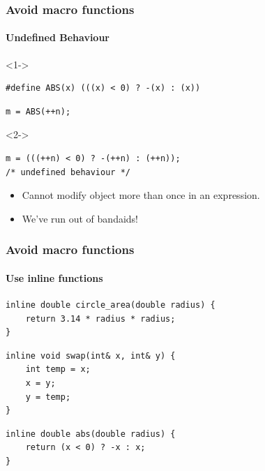 \documentclass[table]{beamer}
\newcounter{rulecount}
\newcommand{\declarerule}{\textbf{\color{themeblue}{Rule \therulecount:}} }
\begin{document}
\begin{frame}[fragile]
    \frametitle{\declarerule Avoid macro functions}
    \framesubtitle{Undefined Behaviour}
    
\begin{uncoverenv}<1->
\begin{lstlisting}[title=A simple abs macro]
#define ABS(x) (((x) < 0) ? -(x) : (x))
\end{lstlisting}

\begin{lstlisting}[title=You write]
m = ABS(++n); 
\end{lstlisting}
\end{uncoverenv}

\begin{uncoverenv}<2->
\begin{lstlisting}[title=The compiler sees]
m = (((++n) < 0) ? -(++n) : (++n));
/* undefined behaviour */
\end{lstlisting}
    \begin{itemize}
        \item Cannot modify object more than once in an expression.
        \item We've run out of bandaids!
    \end{itemize}
\end{uncoverenv}
\end{frame}

\begin{frame}[fragile]
    \frametitle{\declarerule Avoid macro functions}
    \framesubtitle{Use inline functions}
\begin{lstlisting}[title=\textbf{Better solution:} inline functions]
inline double circle_area(double radius) {
    return 3.14 * radius * radius;
}
\end{lstlisting}

\begin{lstlisting}
inline void swap(int& x, int& y) {
    int temp = x;
    x = y;
    y = temp;
}
\end{lstlisting}

\begin{lstlisting}
inline double abs(double radius) {
    return (x < 0) ? -x : x;
}
\end{lstlisting}

\end{frame}
\end{document}
